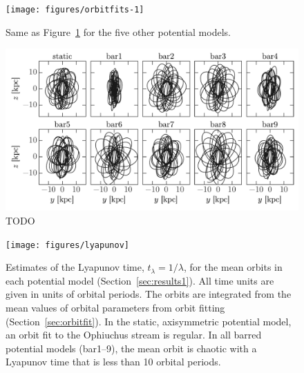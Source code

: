 \documentclass[letterpaper,12pt,preprint]{aastex}
\begin{document}
\clearpage
\begin{figure}[p]
\begin{center}
\texttt{[image: figures/orbitfits-1]}
\caption{Same as Figure~\ref{fig:orbitfits2} for the five other potential models.}
\label{fig:orbitfits2}
\end{center}
\end{figure}

\clearpage
\begin{figure}[p]
\begin{center}
\includegraphics[width=\textwidth]{figures/orbit-yz}
\caption{  TODO }
\label{fig:orbits-yz}
\end{center}
\end{figure}

\clearpage
\begin{figure}[p]
\begin{center}
\texttt{[image: figures/lyapunov]}
\caption{ Estimates of the Lyapunov time, $t_\lambda=1/\lambda$, for the mean orbits in each potential model (Section~\ref{sec:results1}). All time units are given in units of orbital periods. The orbits are integrated from the mean values of orbital parameters from orbit fitting (Section~\ref{sec:orbitfit}). In the static, axisymmetric potential model, an orbit fit to the Ophiuchus stream is regular. In all barred potential models (bar1--9), the mean orbit is chaotic with a Lyapunov time that is less than 10 orbital periods. }
\label{fig:lyapunov}
\end{center}
\end{figure}
\end{document}
